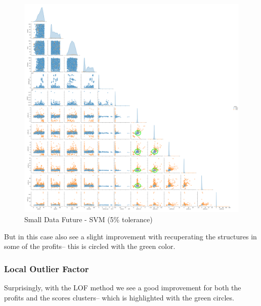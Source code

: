 \documentclass[11pt,english,a4paper,hidelinks]{book}
\begin{document}
\begin{figure}[H]
    \centering
    \includegraphics[width=1\textwidth]{images/code/outliers/Small Data future - SVM.png}
    \caption{Small Data Future - SVM (5\% tolerance)}
    \label{fig:small_data_future_svm}
\end{figure}

\noindent But in this case also see a slight improvement with recuperating the structures in some of the profits--  this is circled with the green color.

\newpage
\subsubsection{Local Outlier Factor}

\noindent Surprisingly, with the LOF method we see a good improvement for both the profits and the scores clusters-- which is highlighted with the green circles.
\end{document}

